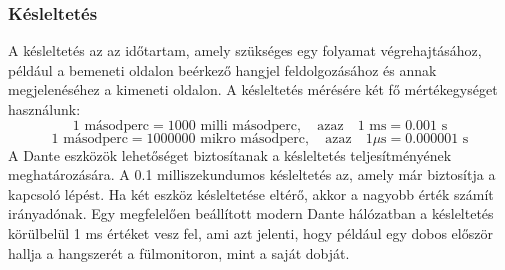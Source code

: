 \subsubsection{Késleltetés}
A késleltetés az az időtartam, amely szükséges egy folyamat végrehajtásához, 
például a bemeneti oldalon beérkező hangjel feldolgozásához és annak megjelenéséhez 
a kimeneti oldalon. A késleltetés mérésére két fő mértékegységet használunk:
\begin{equation}
	\label{eq:milliseconds}
	1 \text{ másodperc} = 1000 \text{ milli másodperc}, \quad \text{azaz} \quad 1 \text{ ms} = 0.001 \text{ s}
\end{equation}
\begin{equation}
	\label{eq:microseconds}
	1 \text{ másodperc} = 1000000 \text{ mikro másodperc}, \quad \text{azaz} \quad 1 \mu\text{s} = 0.000001 \text{ s}
\end{equation}
A Dante eszközök lehetőséget biztosítanak a késleltetés teljesítményének 
meghatározására. A 0.1 milliszekundumos késleltetés az, amely már biztosítja a 
kapcsoló lépést. Ha két eszköz késleltetése eltérő, akkor a nagyobb érték számít 
irányadónak. Egy megfelelően beállított modern Dante hálózatban a késleltetés 
körülbelül 1 ms értéket vesz fel, ami azt jelenti, hogy például egy dobos 
először hallja a hangszerét a fülmonitoron, mint a saját dobját.
